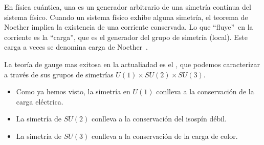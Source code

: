 En física cuántica, una  es un generador arbitrario de una simetría contínua del sistema físico.
Cuando un sistema físico exhibe alguna simetría, el teorema de Noether implica la existencia de una corriente conservada.
Lo que \textquotedblleft fluye\textquotedblright\ en la corriente es la \textquotedblleft carga\textquotedblright, que es el generador del grupo de simetría (local).
Este carga a veces se denomina carga de Noether~\cite{W-CARGA}.

La teoría de gauge mas exitosa en la actualiadad es el , que podemos caracterizar a través de sus grupos de simetrías $U(1)\times SU(2)\times SU(3)$.

\begin{itemize}
	\item Como ya hemos visto, la simetría en $U(1)$ conlleva a la conservación de la carga eléctrica.
	\item La simetría de $SU(2)$ conlleva a la conservación del isospín débil.
	\item La simetría de $SU(3)$ conlleva a la conservación de la carga de color.
\end{itemize}
